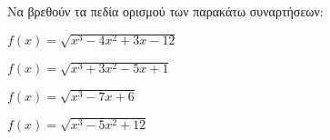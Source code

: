 Να βρεθούν τα πεδία ορισμού των παρακάτω συναρτήσεων:
\begin{alist}
\item $ f(x)=\sqrt{x^3-4x^2+3x-12} $
\item $ f(x)=\sqrt{x^3+3x^2-5x+1} $
\item $ f(x)=\sqrt{x^3-7x+6} $
\item $ f(x)=\sqrt{x^3-5x^2+12} $
\end{alist}
